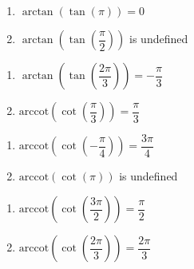 \begin{multicols}{2}

\begin{enumerate}

\setcounter{enumi}{\value{HW}}

\item  $\arctan\left(\tan\left(\pi\right) \right) = 0$ 
\item  $\arctan\left(\tan\left(\dfrac{\pi}{2}\right) \right)$ is undefined

\setcounter{HW}{\value{enumi}}

\end{enumerate}

\end{multicols}

\begin{multicols}{2}

\begin{enumerate}

\setcounter{enumi}{\value{HW}}

\item  $\arctan\left(\tan\left(\dfrac{2\pi}{3}\right) \right) = -\dfrac{\pi}{3}$
\item  $\text{arccot}\left(\cot\left(\dfrac{\pi}{3}\right) \right) = \dfrac{\pi}{3}$ 

\setcounter{HW}{\value{enumi}}

\end{enumerate}

\end{multicols}

\begin{multicols}{2}

\begin{enumerate}

\setcounter{enumi}{\value{HW}}

\item  $\text{arccot}\left(\cot\left(-\dfrac{\pi}{4}\right) \right) = \dfrac{3\pi}{4}$
\item  $\text{arccot}\left(\cot\left(\pi\right) \right)$ is undefined 

\setcounter{HW}{\value{enumi}}

\end{enumerate}

\end{multicols}

\begin{multicols}{2}

\begin{enumerate}

\setcounter{enumi}{\value{HW}}

\item  $\text{arccot}\left(\cot\left(\dfrac{3\pi}{2}\right) \right) = \dfrac{\pi}{2}$
\item  $\text{arccot}\left(\cot\left(\dfrac{2\pi}{3}\right) \right) = \dfrac{2\pi}{3}$

\setcounter{HW}{\value{enumi}}

\end{enumerate}

\end{multicols}

